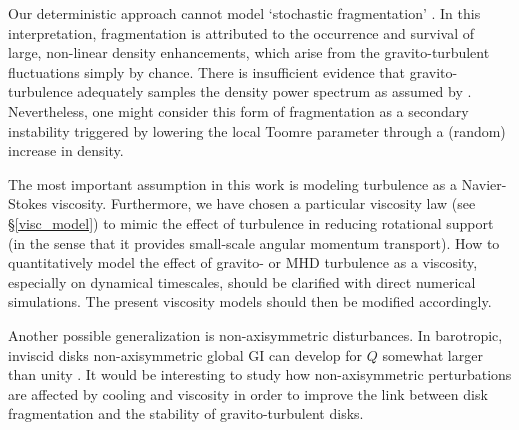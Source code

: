 
Our deterministic approach cannot model `stochastic fragmentation'
\citep{paardekooper12,hopkins13}. In this interpretation,  
fragmentation is attributed to the occurrence and survival 
of large, non-linear density enhancements, which arise from the
gravito-turbulent fluctuations simply by chance. %
There is insufficient evidence that gravito-turbulence adequately samples
the density power spectrum as assumed by \cite{hopkins13}.
Nevertheless, one might consider this form of fragmentation as a secondary instability
triggered by lowering the local 
Toomre parameter through a (random) increase in density. 


The most important assumption in this work is modeling turbulence as a  
Navier-Stokes viscosity. Furthermore, we have chosen a particular  
viscosity law (see \S\ref{visc_model}) to mimic the effect of 
turbulence in reducing rotational support (in the sense that it
provides small-scale angular momentum transport). 
How to quantitatively model the effect of gravito- or MHD turbulence  
as a viscosity, especially on dynamical timescales, should be 
clarified with direct numerical simulations. The present viscosity
models should then be modified accordingly. 

Another possible generalization is non-axisymmetric
disturbances. In barotropic, inviscid disks  
non-axisymmetric global GI can develop for $Q$ somewhat larger than unity
\citep{papaloizou89,adams89,papaloizou91,laughlin97}. It would be interesting to study
how non-axisymmetric perturbations are affected by cooling and
viscosity in order to improve %
the link between disk fragmentation and the
stability of gravito-turbulent disks.   



